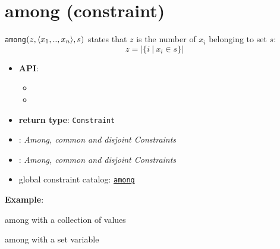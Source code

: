 \label{among}
\hypertarget{among}{}

\section{among (constraint)}\label{among:amongconstraint}\hypertarget{among:amongconstraint}{}




% 


\begin{notedef}
\texttt{among}$(z, \langle x_1,..,x_n\rangle, s)$ states that $z$ is the number of $x_i$ belonging to set $s$:
 $$ z = \vert\lbrace i\ |\ x_i \in s \rbrace\vert $$  
\end{notedef}

\begin{itemize}
\item \textbf{API}: 
  \begin{itemize}
  \item {}
  \item {}
  \end{itemize}
	\item \textbf{return type}: \texttt{Constraint}
	\item  \cite{Bessiere05ERCIM}: \emph{\textit{Among}, \textit{common} and \textit{disjoint} Constraints}
	\item  \cite{Bessiere06ERCIM}: \emph{\textit{Among}, \textit{common} and \textit{disjoint} Constraints}
	\item global constraint catalog: \href{http://www.emn.fr/x-info/sdemasse/gccat/Camong.html}{\tt among}
\end{itemize}

\textbf{Example}:

among with a collection of values


among with a set variable

